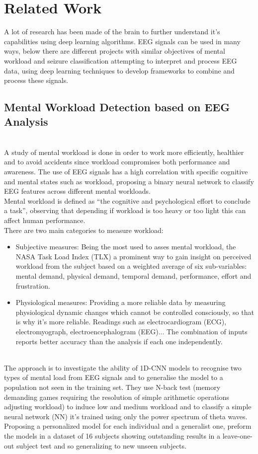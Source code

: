 \section{Related Work}
\label{sec-related-work}
A lot of research has been made of the brain to further understand it’s capabilities using deep learning algorithms. EEG signals can be used in many ways, below there are different projects with similar objectives of mental workload and seizure classification attempting to interpret and process EEG data, using deep learning techniques to develop frameworks to combine and process these signals.
\\
\subsection{Mental Workload Detection based on EEG Analysis}
\leavevmode\\
A study of mental workload\cite{wrokload} is done in order to work more efficiently, healthier and to avoid accidents since workload compromises both performance and awareness. The use of EEG signals has a high correlation with specific cognitive and mental states such as workload, proposing a binary neural network to classify EEG features across different mental workloads.
\\
Mental workload is defined as “the cognitive and psychological effort to conclude a task”, observing that depending if workload is too heavy or too light this can affect human performance. 
\\
There are two main categories to measure workload:
\\
\begin{itemize}
\item Subjective measures: Being the most used to asses mental workload, the NASA Task Load Index (TLX) a prominent way to gain insight on perceived workload from the subject based on a weighted average of six sub-variables: mental demand, physical demand, temporal demand, performance, effort and frustration. 
\item Physiological measures: Providing a more reliable data by measuring physiological dynamic changes which cannot be controlled consciously, so that is why it’s more reliable. Readings such as electrocardiogram (ECG), electromyograph, electroencephalogram (EEG)... The combination of inputs reports better accuracy than the analysis if each one independently.
\end{itemize}
\leavevmode\\
The approach is to investigate the ability of 1D-CNN models to recognise two types of mental load from EEG signals and to generalise the model to a population not seen in the training set. They use N-back test (memory demanding games requiring the resolution of simple arithmetic operations adjusting workload) to induce low and medium workload and to classify a simple neural network (NN) it’s trained using only the power spectrum of theta waves. Proposing a personalized model for each individual and a generalist one, preform the models in a dataset of 16 subjects showing outstanding results in a leave-one-out subject test and so generalizing to new unseen subjects.
